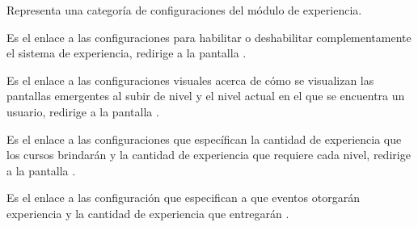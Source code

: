     \begin{description}[font=\color{primary}]

            Representa una categoría de configuraciones del módulo de experiencia. \hfill

        \begin{description}[font={\labelitemi\ \color{black}}]

            Es el enlace a las configuraciones para habilitar o deshabilitar complementamente
            el sistema de experiencia, redirige a la pantalla .

            Es el enlace a las configuraciones visuales acerca de cómo se visualizan las
            pantallas emergentes al subir de nivel y el nivel actual en el que se encuentra
            un usuario, redirige a la pantalla .

            Es el enlace a las configuraciones que específican la cantidad de experiencia que
            los cursos brindarán y la cantidad de experiencia que requiere cada nivel, redirige
            a la pantalla .

            Es el enlace a las configuración que especifican a que eventos otorgarán experiencia
            y la cantidad de experiencia que entregarán .
        \end{description}

    \end{description}

